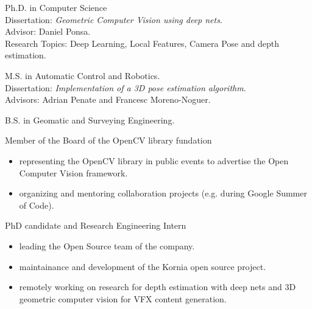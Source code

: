 \documentclass{article}
\begin{document}


\begin{llist}
\label{Education}

 
Ph.D. in Computer Science\\
Dissertation: \textit{Geometric Computer Vision using deep nets}.\\
Advisor: Daniel Ponsa.\\
Research Topics: Deep Learning, Local Features, Camera Pose and depth estimation.

 
M.S. in Automatic Control and Robotics.\\
Dissertation: \textit{Implementation of a 3D pose estimation algorithm}.\\
Advisors: Adrian Penate and Francesc Moreno-Noguer.

 
B.S. in Geomatic and Surveying Engineering.


\label{Work Experience}
\vspace{-0.33cm}

\location{}
Member of the Board of the OpenCV library fundation
\vspace{-0.33cm}
\begin{itemize}
 \item representing the OpenCV library in public events to advertise the Open Computer Vision framework.
 \item organizing and mentoring collaboration projects (e.g. during Google Summer of Code).
\end{itemize}

PhD candidate and Research Engineering Intern
\vspace{-0.33cm}
\begin{itemize}
 \item leading the Open Source team of the company.
 \item maintainance and development of the Kornia open source project.
 \item remotely working on research for depth estimation with deep nets and 3D geometric computer vision for VFX content generation.
\end{itemize}


\end{llist}
\end{document}
